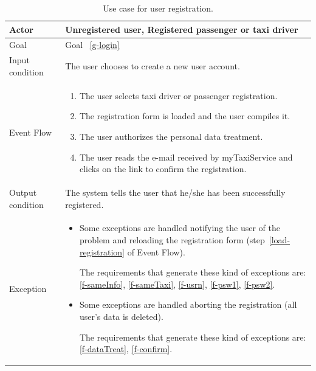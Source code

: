 \begin{table}
\begin{center}
\begin{tabular}{| l | p{} |}
\hline
Actor & Unregistered user, Registered passenger or taxi driver \\
\hline
Goal & Goal ~\ref{g-login}
\\
\hline
Input condition & The user chooses to create a new user account.  \\
\hline
Event Flow & \begin{enumerate}
	\item The user selects taxi driver or passenger registration.
	\item The registration form is loaded and the user compiles it.\label{load-registration}
	\item The user authorizes the personal data treatment.
	\item The user reads the e-mail received by myTaxiService and clicks on the link to confirm the registration.
	\end{enumerate}
\\
\hline
Output condition & The system tells the user that he/she has been successfully registered. \\
\hline

Exception &  \begin{itemize}
	\item Some exceptions are handled notifying the user of the problem and reloading the registration form (step~\ref{load-registration} of Event Flow).

	The requirements that generate these kind of exceptions are:
	\ref{f-sameInfo},    %
	\ref{f-sameTaxi},   %
	\ref{f-usrn},       %
	\ref{f-psw1},     %
	\ref{f-psw2}.    %
	\item Some exceptions are handled aborting the registration (all user's data is deleted).

	The requirements that generate these kind of exceptions are:
	\ref{f-dataTreat},   %
	\ref{f-confirm}.   %
	\end{itemize}
 \\
\hline
\end{tabular}
\end{center}
\caption{Use case for user registration.}
\label{usecase-registration}
\end{table}

